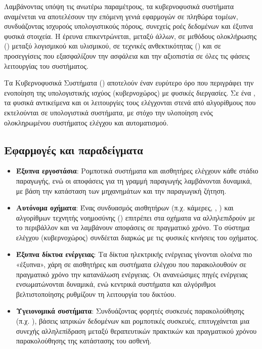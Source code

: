 Λαμβάνοντας υπόψη τις ανωτέρω παραμέτρους, τα κυβερνοφυσικά συστήματα αναμένεται να
αποτελέσουν την επόμενη γενιά εφαρμογών σε πληθώρα τομέων, συνδυάζοντας ισχυρούς
υπολογιστικούς πόρους, συνεχείς ροές δεδομένων και έξυπνα φυσικά στοιχεία. Η έρευνα
επικεντρώνεται, μεταξύ άλλων, σε μεθόδους ολοκλήρωσης () μεταξύ λογισμικού
και υλισμικού, σε τεχνικές ανθεκτικότητας () και σε προσεγγίσεις που
εξασφαλίζουν την ασφάλεια και την αξιοπιστία σε όλες τις φάσεις λειτουργίας του συστήματος.

Τα Κυβερνοφυσικά Συστήματα () αποτελούν έναν ευρύτερο όρο που περιγράφει την ενοποίηση της υπολογιστικής ισχύος (κυβερνοχώρος) με φυσικές διεργασίες. Σε ένα , τα φυσικά αντικείμενα και οι λειτουργίες τους ελέγχονται στενά από αλγορίθμους που εκτελούνται σε υπολογιστικά συστήματα, με στόχο την υλοποίηση ενός ολοκληρωμένου συστήματος ελέγχου και αυτοματισμού.


\subsection{Εφαρμογές και παραδείγματα }

\begin{itemize}
  \item \textbf{Έξυπνα εργοστάσια}: Ρομποτικά συστήματα και αισθητήρες ελέγχουν κάθε στάδιο παραγωγής, ενώ οι αποφάσεις για τη γραμμή παραγωγής λαμβάνονται δυναμικά, με βάση την κατάσταση των μηχανημάτων και την παραγωγική ζήτηση.
  \item \textbf{Αυτόνομα οχήματα}: Ένας συνδυασμός αισθητήρων (π.χ. κάμερες, , ) και αλγορίθμων τεχνητής νοημοσύνης () επιτρέπει στα οχήματα να αλληλεπιδρούν με το περιβάλλον και να λαμβάνουν αποφάσεις σε πραγματικό χρόνο. Το σύστημα ελέγχου (κυβερνοχώρος) συνδέεται διαρκώς με τις φυσικές κινήσεις του οχήματος.
  \item \textbf{Έξυπνα δίκτυα ενέργειας}: Τα δίκτυα ηλεκτρικής ενέργειας γίνονται ολοένα πιο «έξυπνα», χάρη σε αισθητήρες και συστήματα ελέγχου που παρακολουθούν σε πραγματικό χρόνο την κατανάλωση ενέργειας. Οι ανανεώσιμες πηγές ενέργειας ενσωματώνονται δυναμικά, ενώ κεντρικά συστήματα και αλγόριθμοι βελτιστοποίησης ρυθμίζουν τη λειτουργία του δικτύου.
  \item \textbf{Υγειονομικά συστήματα}: Συνδυάζοντας φορητές συσκευές παρακολούθησης (π.χ. ), βάσεις ιατρικών δεδομένων και ρομποτικές συσκευές, επιτυγχάνεται μια συνεχής αλληλεπίδραση μεταξύ θεραπευτικών πρακτικών και πραγματικού χρόνου παρακολούθησης της κατάστασης του ασθενή.
\end{itemize}

